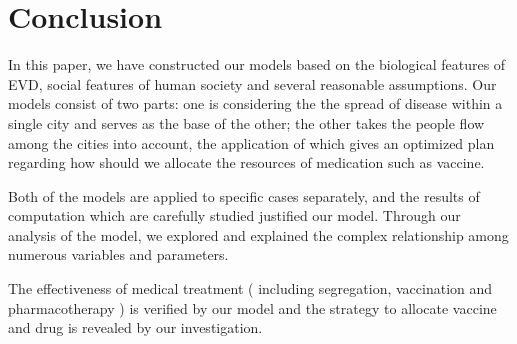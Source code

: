 \section{Conclusion}

In this paper, we have constructed our models based on the biological features of EVD, social features of human society and several reasonable assumptions. Our models consist of two parts: one is considering the the spread of disease within a single city and serves as the base of the other; the other takes the people flow among the cities into account, the application of which gives an optimized plan regarding how should we allocate the resources of medication such as vaccine.

Both of the models are applied to specific cases separately, and the results of computation which are carefully studied justified our model. Through our analysis of the model, we explored and explained the complex relationship among numerous variables and parameters.

The effectiveness of medical treatment ( including segregation, vaccination and pharmacotherapy ) is verified by our model and the strategy to allocate vaccine and drug is revealed by our investigation.
